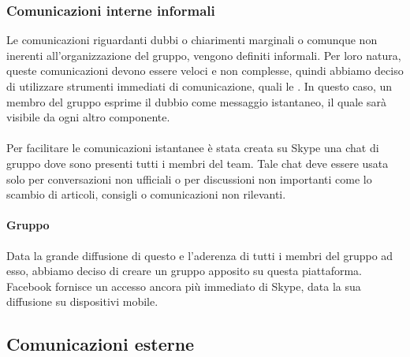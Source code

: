 \subsubsection{Comunicazioni interne informali}
Le comunicazioni riguardanti dubbi o chiarimenti marginali o comunque non inerenti all'organizzazione del gruppo, vengono definiti informali. Per loro natura, queste comunicazioni devono essere veloci e non complesse, quindi abbiamo deciso di utilizzare strumenti immediati di comunicazione, quali le . In questo caso, un membro del gruppo esprime il dubbio come messaggio istantaneo, il quale sarà visibile da ogni altro componente.

\paragraph{}
\label{3.2.1}
Per facilitare le comunicazioni istantanee è stata creata su Skype una chat di gruppo dove sono presenti tutti i membri del team. Tale chat deve essere usata solo per conversazioni non ufficiali o per discussioni non importanti come lo scambio di articoli, consigli o comunicazioni non rilevanti.

\paragraph{Gruppo }
Data la grande diffusione di questo  e l'aderenza di tutti i membri del gruppo ad esso, abbiamo deciso di creare un gruppo apposito su questa piattaforma. Facebook fornisce un accesso ancora più immediato di Skype, data la sua diffusione su dispositivi mobile.

\subsection{Comunicazioni esterne}
